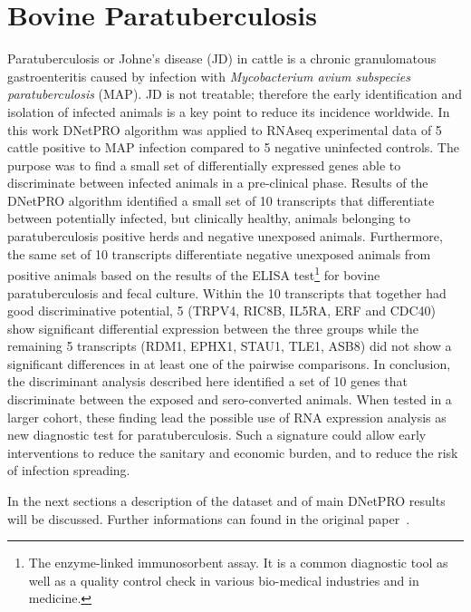 \documentclass{standalone}
\begin{document}
\section[Bovine Dataset]{Bovine Paratuberculosis}\label{bovine:bovine}

Paratuberculosis or Johne's disease (JD) in cattle is a chronic granulomatous gastroenteritis caused by infection with \emph{Mycobacterium avium subspecies paratuberculosis} (MAP).
JD is not treatable; therefore the early identification and isolation of infected animals is a key point to reduce its incidence worldwide.
In this work DNetPRO algorithm was applied to RNAseq experimental data of 5 cattle positive to MAP infection compared to 5 negative uninfected controls.
The purpose was to find a small set of differentially expressed genes able to discriminate between infected animals in a pre-clinical phase.
Results of the DNetPRO algorithm identified a small set of 10 transcripts that differentiate between potentially infected, but clinically healthy, animals belonging to paratuberculosis positive herds and negative unexposed animals.
Furthermore, the same set of 10 transcripts differentiate negative unexposed animals from positive animals based on the results of the ELISA test\footnote{
  The enzyme-linked immunosorbent assay.
  It is a common diagnostic tool as well as a quality control check in various bio-medical industries and in medicine.
} for bovine paratuberculosis and fecal culture.
Within the 10 transcripts that together had good discriminative potential, 5 (TRPV4, RIC8B, IL5RA, ERF and CDC40) show significant differential expression between the three groups while the remaining 5 transcripts (RDM1, EPHX1, STAU1, TLE1, ASB8) did not show a significant differences in at least one of the pairwise comparisons.
In conclusion, the discriminant analysis described here identified a set of 10 genes that discriminate between the exposed and sero-converted animals.
When tested in a larger cohort, these finding lead the possible use of RNA expression analysis as new diagnostic test for paratuberculosis.
Such a signature could allow early interventions to reduce the sanitary and economic burden, and to reduce the risk of infection spreading.

In the next sections a description of the dataset and of main DNetPRO results will be discussed.
Further informations can found in the original paper~\cite{Malvisi2019}.
\end{document}
